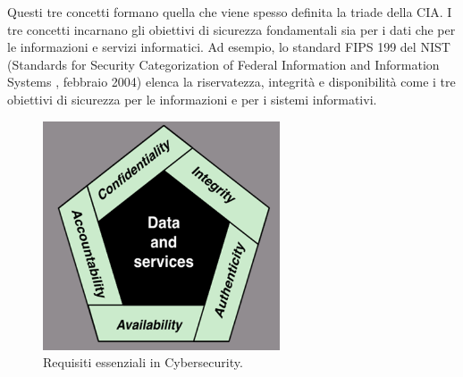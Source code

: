 \noindent
Questi tre concetti formano quella che viene spesso definita la triade della CIA. I tre
concetti incarnano gli obiettivi di sicurezza fondamentali sia per i dati che per le informazioni
e servizi informatici. Ad esempio, lo standard FIPS 199 del NIST (Standards for Security
Categorization of Federal Information and Information Systems , febbraio 2004) elenca la riservatezza, integrità e disponibilità come i tre obiettivi di sicurezza per le informazioni e
per i sistemi informativi.
\begin{figure}[H]
	\centering
    \includegraphics[width=7cm, keepaspectratio]{bistarelli/img/cap_1/cia.png}
	\caption{Requisiti essenziali in Cybersecurity.}\label{fig:cia}
\end{figure}

